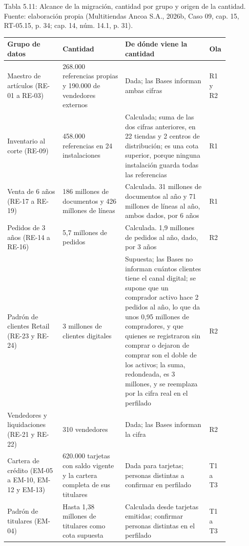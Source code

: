 \documentclass[11pt]{article}
\begin{document}
Tabla 5.11: Alcance de la migración, cantidad por grupo y origen de la cantidad. Fuente: elaboración propia (Multitiendas Ancoa S.A., 2026b, Caso 09, cap. 15, RT-05.15, p. 34; cap. 14, núm. 14.1, p. 31).\label{tab:t16}\par\nopagebreak
\begin{longtable}{@{}p{0.239\linewidth}p{0.260\linewidth}p{0.356\linewidth}p{0.048\linewidth}@{}}
\toprule Grupo de datos & Cantidad & De dónde viene la cantidad & Ola \\
\midrule\endhead\bottomrule\endlastfoot
Maestro de artículos (RE-01 a RE-03) & 268.000 referencias propias y 190.000 de vendedores externos & Dada; las Bases informan ambas cifras & R1 y R2 \\
Inventario al corte (RE-09) & 458.000 referencias en 24 instalaciones & Calculada; suma de las dos cifras anteriores, en 22 tiendas y 2 centros de distribución; es una cota superior, porque ninguna instalación guarda todas las referencias & R1 \\
Venta de 6 años (RE-17 a RE-19) & 186 millones de documentos y 426 millones de líneas & Calculada. 31 millones de documentos al año y 71 millones de líneas al año, ambos dados, por 6 años & R1 \\
Pedidos de 3 años (RE-14 a RE-16) & 5,7 millones de pedidos & Calculada. 1,9 millones de pedidos al año, dado, por 3 años & R2 \\
Padrón de clientes Retail (RE-23 y RE-24) & 3 millones de clientes digitales & Supuesta; las Bases no informan cuántos clientes tiene el canal digital; se supone que un comprador activo hace 2 pedidos al año, lo que da unos 0,95 millones de compradores, y que quienes se registraron sin comprar o dejaron de comprar son el doble de los activos; la suma, redondeada, es 3 millones, y se reemplaza por la cifra real en el perfilado & R2 \\
Vendedores y liquidaciones (RE-21 y RE-22) & 310 vendedores & Dada; las Bases informan la cifra & R2 \\
Cartera de crédito (EM-05 a EM-10, EM-12 y EM-13) & 620.000 tarjetas con saldo vigente y la cartera completa de sus titulares & Dada para tarjetas; personas distintas a confirmar en perfilado & T1 a T3 \\
Padrón de titulares (EM-04) & Hasta 1,38 millones de titulares como cota supuesta & Calculada desde tarjetas emitidas; confirmar personas distintas en el perfilado & T1 a T3 \\
\end{longtable}
\end{document}
